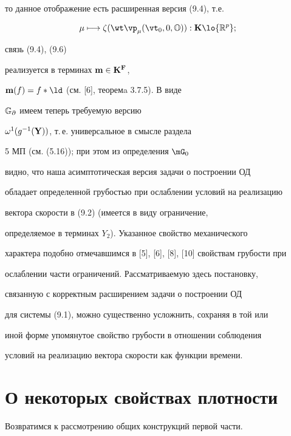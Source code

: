 то данное отображение есть расширенная версия (9.4), т.е.


\begin{equation}


\mu \longmapsto {\zeta}({{\wt \vp}_\mu}({{\vt}_0},0,{\Bbb O})):


{\bold K} \lo {{\Bbb R}^p};


\end{equation}


связь (9.4), (9.6)


реализуется в терминах ${\bold m} \in {\bold K}^{\bold F}$,


${\bold m}(f) = {f*\ld}$ (см. [6], теоремa 3.7.5). В виде


${\Bbb G}_\partial$ имеем теперь требуемую версию


${{\omega}^1}({g^{-1}}({\bold Y}))$, т.\,е. универсальное в смысле раздела


5 МП (см. (5.16)); при этом из определения ${\mG}_0$


видно, что наша асимптотическая версия задачи  о построении ОД


обладает определенной грубостью при ослаблении условий на реализацию


вектора скорости в (9.2) (имеется в виду ограничение,


определяемое в терминах $Y_2$). Указанное свойство механического


характера подобно отмечавшимся в [5], [6], [8], [10] свойствам грубости при


ослаблении части ограничений. Рассматриваемую здесь постановку,


связанную с корректным расширением задачи о построении ОД


для системы (9.1), можно существенно усложнить, сохраняя в той или


иной форме упомянутое свойство грубости в отношении соблюдения


условий на реализацию вектора скорости как функции времени.





\section{О некоторых свойствах плотности}





Возвратимся к рассмотрению общих конструкций первой части.


